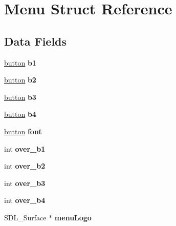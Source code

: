 \hypertarget{structMenu}{}\section{Menu Struct Reference}
\label{structMenu}
\subsection*{Data Fields}
\begin{DoxyCompactItemize}
\item 
\mbox{\label{structMenu_a4e551cc9d8e601477c9b433586e94e85}} 
\mbox{\hyperlink{structbutton}{button}} {\bfseries b1}
\item 
\mbox{\label{structMenu_a6fb16be02b74f37999a5bcbe533acf06}} 
\mbox{\hyperlink{structbutton}{button}} {\bfseries b2}
\item 
\mbox{\label{structMenu_a28dd906295886472d4a1ea8e8891dd87}} 
\mbox{\hyperlink{structbutton}{button}} {\bfseries b3}
\item 
\mbox{\label{structMenu_afa19f7b80780740b37f639305dac3ca2}} 
\mbox{\hyperlink{structbutton}{button}} {\bfseries b4}
\item 
\mbox{\label{structMenu_a4b2624c70703c7855f423289bc815eaf}} 
\mbox{\hyperlink{structbutton}{button}} {\bfseries font}
\item 
\mbox{\label{structMenu_a0ba92851941ea1b803bbd6f2ba66ff89}} 
int {\bfseries over\+\_\+b1}
\item 
\mbox{\label{structMenu_a784b690794a131e672b4a3107c2431ac}} 
int {\bfseries over\+\_\+b2}
\item 
\mbox{\label{structMenu_a5310cc8336a6ec6e540f519428dbef60}} 
int {\bfseries over\+\_\+b3}
\item 
\mbox{\label{structMenu_a1c5318e7c3fd0b29aa561615c1de7f59}} 
int {\bfseries over\+\_\+b4}
\item 
\mbox{\label{structMenu_ad9acec5d1836a35b00b5cd23769dbeab}} 
S\+D\+L\+\_\+\+Surface $\ast$ {\bfseries menu\+Logo}

\end{DoxyCompactItemize}
